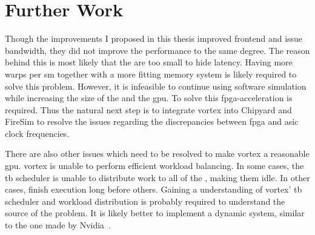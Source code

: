 \section{Further Work}

Though the improvements I proposed in this thesis improved frontend and issue bandwidth, they did not improve the performance to the same degree. The reason behind this is most likely that the  are too small to hide latency. Having more warps per \acrshort{sm} together with a more fitting memory system is likely required to solve this problem. However, it is infeasible to continue using software simulation while increasing the size of the  and the \acrshort{gpu}. To solve this \acrshort{fpga}-acceleration is required. Thus the natural next step is to integrate \Gls{vortex} into Chipyard and FireSim to resolve the issues regarding the discrepancies between \acrshort{fpga} and \acrshort{asic} clock frequencies.

There are also other issues which need to be resolved to make \Gls{vortex} a reasonable \acrshort{gpu}. \Gls{vortex} is unable to perform efficient workload balancing. In some cases, the \acrshort{tb} scheduler is unable to distribute work to all of the , making them idle. In other cases,  finish execution long before others. Gaining a  understanding of \Gls{vortex}' \acrshort{tb} scheduler and workload distribution is probably required to understand the source of the problem. It is likely better to implement a dynamic system, similar to the one made by Nvidia~\cite{CTA_scheduling}.  